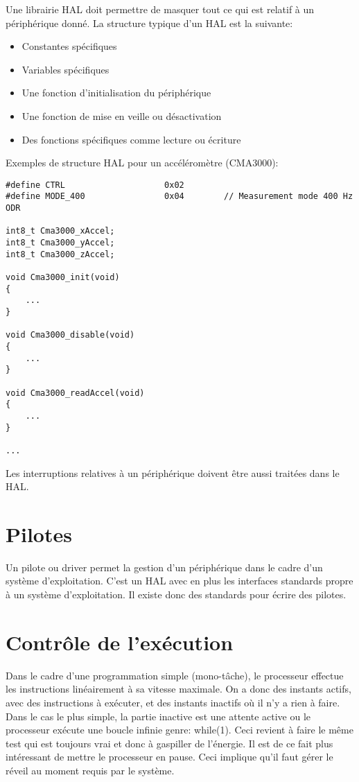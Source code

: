 Une librairie HAL doit permettre de masquer tout ce qui est relatif à un périphérique donné. La structure typique d'un HAL est la suivante:
\begin{itemize}
\item Constantes spécifiques
\item Variables spécifiques
\item Une fonction d'initialisation du périphérique
\item Une fonction de mise en veille ou désactivation
\item Des fonctions spécifiques comme lecture ou écriture
\end{itemize}

Exemples de structure HAL pour un accéléromètre (CMA3000):
\lstset{style=customc}
\begin{lstlisting}
#define CTRL                    0x02
#define MODE_400                0x04        // Measurement mode 400 Hz ODR

int8_t Cma3000_xAccel;
int8_t Cma3000_yAccel;
int8_t Cma3000_zAccel;

void Cma3000_init(void)
{
	...
}

void Cma3000_disable(void)
{
	...
}

void Cma3000_readAccel(void)
{
	...
} 

...
\end{lstlisting}

Les interruptions relatives à un périphérique doivent être aussi traitées dans le HAL.

\section{Pilotes}
Un pilote ou driver permet la gestion d'un périphérique dans le cadre d'un système d'exploitation. C'est un HAL avec en plus les interfaces standards propre à un système d'exploitation. Il existe donc des standards pour écrire des pilotes. 

\section{Contrôle de l'exécution}

Dans le cadre d'une programmation simple (mono-tâche), le processeur effectue les instructions linéairement à sa vitesse maximale. On a donc des instants actifs, avec des instructions à exécuter, et des instants inactifs où il n'y a rien à faire. Dans le cas le plus simple, la partie inactive est une attente active ou le processeur exécute une boucle infinie genre: while(1). Ceci revient à faire le même test qui est toujours vrai et donc à gaspiller de l'énergie. Il est de ce fait plus intéressant de mettre le processeur en pause. Ceci implique qu'il faut gérer le réveil au moment requis par le système.

